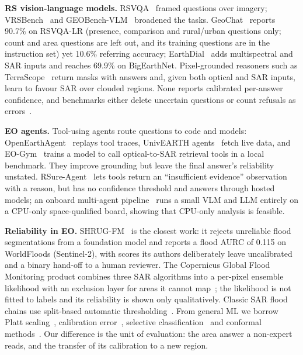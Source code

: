 \documentclass[conference]{IEEEtran}
\begin{document}
\textbf{RS vision-language models.} RSVQA~\cite{lobry2020rsvqa} framed questions over imagery; VRSBench~\cite{li2024vrsbench} and GEOBench-VLM~\cite{danish2025geobench} broadened the tasks. GeoChat~\cite{kuckreja2024geochat} reports 90.7\% on RSVQA-LR (presence, comparison and rural/urban questions only; count and area questions are left out, and its training questions are in the instruction set) yet 10.6\% referring accuracy; EarthDial~\cite{soni2025earthdial} adds multispectral and SAR inputs and reaches 69.9\% on BigEarthNet. Pixel-grounded reasoners such as TerraScope~\cite{shu2026terrascope} return masks with answers and, given both optical and SAR inputs, learn to favour SAR over clouded regions. None reports calibrated per-answer confidence, and benchmarks either delete uncertain questions or count refusals as errors~\cite{zhang2024vleo,li2024vrsbench}.

\textbf{EO agents.} Tool-using agents route questions to code and models: OpenEarthAgent~\cite{shabbir2026openearthagent} replays tool traces, UnivEARTH agents~\cite{kao2026univearth} fetch live data, and EO-Gym~\cite{ma2026eogym} trains a model to call optical-to-SAR retrieval tools in a local benchmark. They improve grounding but leave the final answer's reliability unstated. RSure-Agent~\cite{rsure2026} lets tools return an ``insufficient evidence'' observation with a reason, but has no confidence threshold and answers through hosted models; an onboard multi-agent pipeline~\cite{onboard2026} runs a small VLM and LLM entirely on a CPU-only space-qualified board, showing that CPU-only analysis is feasible.

\textbf{Reliability in EO.} SHRUG-FM~\cite{gonzalez2026shrug} is the closest work: it rejects unreliable flood segmentations from a foundation model and reports a flood AURC of 0.115 on WorldFloods (Sentinel-2), with scores its authors deliberately leave uncalibrated and a binary hand-off to a human reviewer. The Copernicus Global Flood Monitoring product combines three SAR algorithms into a per-pixel ensemble likelihood with an exclusion layer for areas it cannot map~\cite{krullikowski2023gfm}; the likelihood is not fitted to labels and its reliability is shown only qualitatively. Classic SAR flood chains use split-based automatic thresholding~\cite{martinis2009split,twele2016s1flood}. From general ML we borrow Platt scaling~\cite{platt2000probabilities}, calibration error~\cite{guo2017calibration}, selective classification~\cite{geifman2017selective} and conformal methods~\cite{angelopoulos2021raps}. Our difference is the unit of evaluation: the area answer a non-expert reads, and the transfer of its calibration to a new region.
\end{document}

